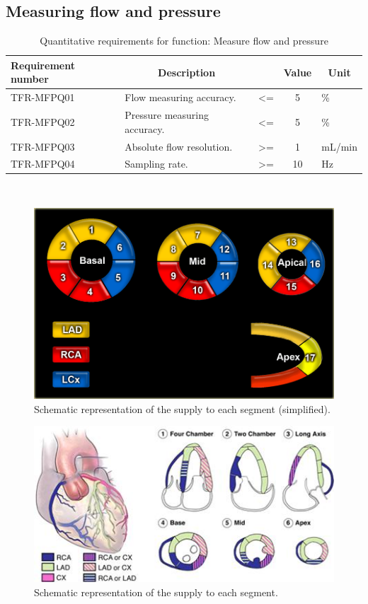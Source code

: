 \subsection{Measuring flow and pressure}
\begin{table}[H]
\caption{Quantitative requirements for function: Measure flow and pressure}
\label{tab:measflow_quan}
\begin{tabular}{p{25mm}|p{65mm}ccp{20mm}|}
	\textbf{Requirement number} & \multicolumn{1}{c}{\textbf{Description}} & \multicolumn{1}{c}{ } & \multicolumn{1}{c}{\textbf{Value}} & \multicolumn{1}{c}{\textbf{Unit}} \\
	\hline
	TFR-MFPQ01	& Flow measuring accuracy. 		 			 & <= 		& 5 		& \% \\
	TFR-MFPQ02 	& Pressure measuring accuracy.		 		 & <= 		& 5 		& \% \\
	TFR-MFPQ03 	& Absolute flow resolution.				 	 & >=	 	& 1 		& mL/min \\
	TFR-MFPQ04  & Sampling rate.					 		 & >= 		& 10 		& Hz \\
	\cline{2-5}
\end{tabular} \\
\raggedright
\end{table}

\begin{figure}[H]
	\includegraphics[width=0.5\linewidth]{./images/17_supply.png}
	\caption{Schematic representation of the supply to each segment (simplified).}
	\label{fig:segment_supply}
\end{figure}

\begin{figure}[H]
	\includegraphics[width=0.5\linewidth]{./images/17_segment_2.jpg}
	\caption{Schematic representation of the supply to each segment.}
	\label{fig:segment_supply2}
\end{figure}


